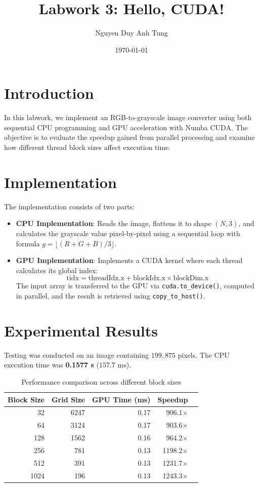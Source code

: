 \documentclass{report}
\title{Labwork 3: Hello, CUDA!}
\author{Nguyen Duy Anh Tung}
\date{\today}
\begin{document}
\maketitle

\section{Introduction}
In this labwork, we implement an RGB-to-grayscale image converter using both sequential CPU programming and GPU acceleration with Numba CUDA. The objective is to evaluate the speedup gained from parallel processing and examine how different thread block sizes affect execution time.

\section{Implementation}
The implementation consists of two parts:
\begin{itemize}
    \item \textbf{CPU Implementation}: Reads the image, flattens it to shape $(N, 3)$, and calculates the grayscale value pixel-by-pixel using a sequential loop with formula $g = \lfloor(R + G + B) / 3\rfloor$.
    \item \textbf{GPU Implementation}: Implements a CUDA kernel where each thread calculates its global index:
    \[
    \text{tidx} = \text{threadIdx.x} + \text{blockIdx.x} \times \text{blockDim.x}
    \]
    The input array is transferred to the GPU via \texttt{cuda.to\_device()}, computed in parallel, and the result is retrieved using \texttt{copy\_to\_host()}.
\end{itemize}

\section{Experimental Results}
Testing was conducted on an image containing $199,875$ pixels. The CPU execution time was \textbf{0.1577 s} ($157.7\text{ ms}$).

\begin{table}[htbp]
\centering
\begin{tabular}{rrrrr}
\toprule
\textbf{Block Size} & \textbf{Grid Size} & \textbf{GPU Time (ms)} & \textbf{Speedup} \\
\midrule
32   & 6247 & 0.17 & 906.1$\times$ \\
64   & 3124 & 0.17 & 903.6$\times$ \\
128  & 1562 & 0.16 & 964.2$\times$ \\
256  & 781  & 0.13 & 1198.2$\times$ \\
512  & 391  & 0.13 & 1231.7$\times$ \\
1024 & 196  & 0.13 & 1243.3$\times$ \\
\bottomrule
\end{tabular}
\caption{Performance comparison across different block sizes}
\end{table}
\end{document}
